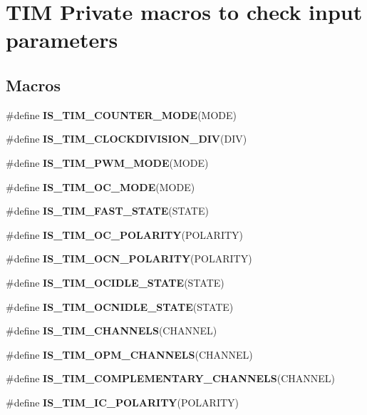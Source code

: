 \hypertarget{group___t_i_m___i_s___t_i_m___definitions}{}\section{T\+IM Private macros to check input parameters}
\label{group___t_i_m___i_s___t_i_m___definitions}
\subsection*{Macros}
\begin{DoxyCompactItemize}
\item 
\#define {\bfseries I\+S\+\_\+\+T\+I\+M\+\_\+\+C\+O\+U\+N\+T\+E\+R\+\_\+\+M\+O\+DE}(M\+O\+DE)
\item 
\#define {\bfseries I\+S\+\_\+\+T\+I\+M\+\_\+\+C\+L\+O\+C\+K\+D\+I\+V\+I\+S\+I\+O\+N\+\_\+\+D\+IV}(D\+IV)
\item 
\#define {\bfseries I\+S\+\_\+\+T\+I\+M\+\_\+\+P\+W\+M\+\_\+\+M\+O\+DE}(M\+O\+DE)
\item 
\#define {\bfseries I\+S\+\_\+\+T\+I\+M\+\_\+\+O\+C\+\_\+\+M\+O\+DE}(M\+O\+DE)
\item 
\#define {\bfseries I\+S\+\_\+\+T\+I\+M\+\_\+\+F\+A\+S\+T\+\_\+\+S\+T\+A\+TE}(S\+T\+A\+TE)
\item 
\#define {\bfseries I\+S\+\_\+\+T\+I\+M\+\_\+\+O\+C\+\_\+\+P\+O\+L\+A\+R\+I\+TY}(P\+O\+L\+A\+R\+I\+TY)
\item 
\#define {\bfseries I\+S\+\_\+\+T\+I\+M\+\_\+\+O\+C\+N\+\_\+\+P\+O\+L\+A\+R\+I\+TY}(P\+O\+L\+A\+R\+I\+TY)
\item 
\#define {\bfseries I\+S\+\_\+\+T\+I\+M\+\_\+\+O\+C\+I\+D\+L\+E\+\_\+\+S\+T\+A\+TE}(S\+T\+A\+TE)
\item 
\#define {\bfseries I\+S\+\_\+\+T\+I\+M\+\_\+\+O\+C\+N\+I\+D\+L\+E\+\_\+\+S\+T\+A\+TE}(S\+T\+A\+TE)
\item 
\#define {\bfseries I\+S\+\_\+\+T\+I\+M\+\_\+\+C\+H\+A\+N\+N\+E\+LS}(C\+H\+A\+N\+N\+EL)
\item 
\#define {\bfseries I\+S\+\_\+\+T\+I\+M\+\_\+\+O\+P\+M\+\_\+\+C\+H\+A\+N\+N\+E\+LS}(C\+H\+A\+N\+N\+EL)
\item 
\#define {\bfseries I\+S\+\_\+\+T\+I\+M\+\_\+\+C\+O\+M\+P\+L\+E\+M\+E\+N\+T\+A\+R\+Y\+\_\+\+C\+H\+A\+N\+N\+E\+LS}(C\+H\+A\+N\+N\+EL)
\item 
\#define {\bfseries I\+S\+\_\+\+T\+I\+M\+\_\+\+I\+C\+\_\+\+P\+O\+L\+A\+R\+I\+TY}(P\+O\+L\+A\+R\+I\+TY)
\item 

\end{DoxyCompactItemize}
